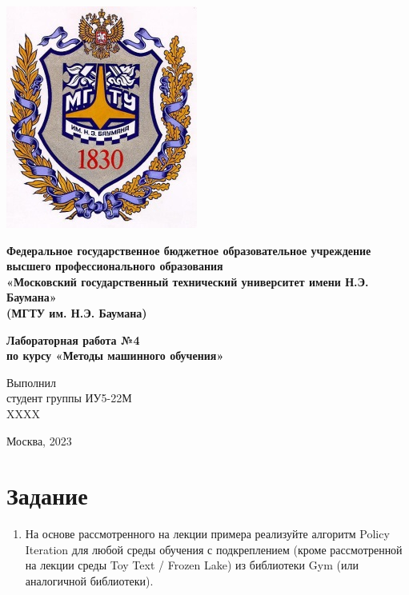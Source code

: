 \documentclass[a4paper]{article}
\begin{document}
  \fontsize{14}{16}\selectfont

  \begin{titlepage}
    \begin{minipage}{0.2\textwidth}
      \includegraphics[scale=0.4]{logo}
    \end{minipage}
    \begin{minipage}{0.7\textwidth}\centering
      \fontsize{10}{12}\selectfont
      \textbf{
        Федеральное государственное бюджетное образовательное учреждение \\
        высшего профессионального образования \\
        «Московский государственный технический университет имени Н.Э. Баумана» \\
        (МГТУ им. Н.Э. Баумана)
      }
    \end{minipage}

    \vspace{5cm}
    \centering
    \fontsize{16}{20}\textbf{
      Лабораторная работа №4 \\
      по курсу «Методы машинного обучения» \\
    }

    \vspace{5cm}
    \begin{flushright}
    Выполнил \\
    студент группы ИУ5-22М \\
    XXXX \\
    \end{flushright}
    \vspace*{\fill}
    Москва, 2023
  \end{titlepage}

  \justifying
  \setlength{\parindent}{1.25cm}

  \section{Задание}
  \begin{enumerate}[leftmargin=1.25cm]
    \item На основе рассмотренного на лекции примера реализуйте алгоритм Policy Iteration
      для любой среды обучения с подкреплением (кроме рассмотренной на лекции среды Toy Text / Frozen Lake)
      из библиотеки Gym (или аналогичной библиотеки).
  \end{enumerate}
\end{document}
